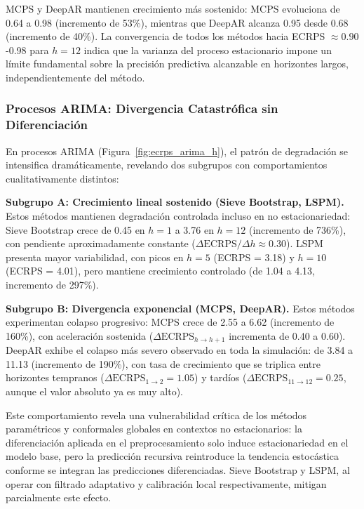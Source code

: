 MCPS y DeepAR mantienen crecimiento más sostenido: MCPS evoluciona de 0.64 a 0.98 (incremento de 53\%), mientras que DeepAR alcanza 0.95 desde 0.68 (incremento de 40\%). La convergencia de todos los métodos hacia ECRPS $\approx 0.90$-0.98 para $h=12$ indica que la varianza del proceso estacionario impone un límite fundamental sobre la precisión predictiva alcanzable en horizontes largos, independientemente del método.

\subsubsection{Procesos ARIMA: Divergencia Catastrófica sin Diferenciación}

En procesos ARIMA (Figura~\ref{fig:ecrps_arima_h}), el patrón de degradación se intensifica dramáticamente, revelando dos subgrupos con comportamientos cualitativamente distintos:

\textbf{Subgrupo A: Crecimiento lineal sostenido (Sieve Bootstrap, LSPM).} Estos métodos mantienen degradación controlada incluso en no estacionariedad: Sieve Bootstrap crece de 0.45 en $h=1$ a 3.76 en $h=12$ (incremento de 736\%), con pendiente aproximadamente constante ($\Delta \text{ECRPS}/\Delta h \approx 0.30$). LSPM presenta mayor variabilidad, con picos en $h=5$ (ECRPS = 3.18) y $h=10$ (ECRPS = 4.01), pero mantiene crecimiento controlado (de 1.04 a 4.13, incremento de 297\%).

\textbf{Subgrupo B: Divergencia exponencial (MCPS, DeepAR).} Estos métodos experimentan colapso progresivo: MCPS crece de 2.55 a 6.62 (incremento de 160\%), con aceleración sostenida ($\Delta \text{ECRPS}_{h \to h+1}$ incrementa de 0.40 a 0.60). DeepAR exhibe el colapso más severo observado en toda la simulación: de 3.84 a 11.13 (incremento de 190\%), con tasa de crecimiento que se triplica entre horizontes tempranos ($\Delta \text{ECRPS}_{1 \to 2} = 1.05$) y tardíos ($\Delta \text{ECRPS}_{11 \to 12} = 0.25$, aunque el valor absoluto ya es muy alto).

Este comportamiento revela una vulnerabilidad crítica de los métodos paramétricos y conformales globales en contextos no estacionarios: la diferenciación aplicada en el preprocesamiento solo induce estacionariedad en el modelo base, pero la predicción recursiva reintroduce la tendencia estocástica conforme se integran las predicciones diferenciadas. Sieve Bootstrap y LSPM, al operar con filtrado adaptativo y calibración local respectivamente, mitigan parcialmente este efecto.

